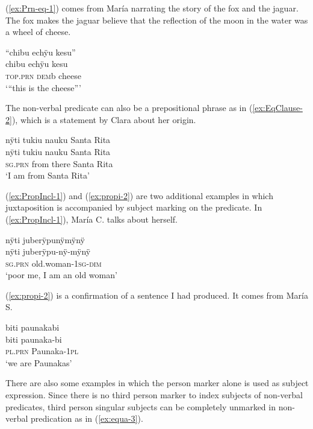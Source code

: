 (\ref{ex:Prn-eq-1}) comes from María narrating the story of the fox and the jaguar. The fox makes the jaguar believe that the reflection of the moon in the water was a wheel of cheese.

\ea\label{ex:Prn-eq-1}
\begingl
\glpreamble “chibu echÿu kesu”\\
\gla chibu echÿu kesu\\
\textsc{top.prn} \textsc{dem}b cheese\\
\glft ‘“this is the cheese”’
\endgl
\trailingcitation{[rxx-n120511l-1.037]}
\xe

The non-verbal predicate can also be a prepositional phrase as in (\ref{ex:EqClause-2}), which is a statement by Clara about her origin.

\ea\label{ex:EqClause-2}
\begingl 
\glpreamble nÿti tukiu nauku Santa Rita\\
\gla nÿti tukiu nauku {Santa Rita}\\ 
\textsc{sg.prn} from there {Santa Rita}\\ 
\glft ‘I am from Santa Rita’
\trailingcitation{[cxx-e121130s.011]}
\xe

(\ref{ex:PropIncl-1}) and (\ref{ex:propi-2}) are two additional examples in which juxtaposition is accompanied by subject marking on the predicate. In (\ref{ex:PropIncl-1}), María C. talks about herself.

\ea\label{ex:PropIncl-1}
\begingl 
\glpreamble nÿti juberÿpunÿmÿnÿ\\
\gla nÿti juberÿpu-nÿ-mÿnÿ\\ 
\textsc{sg.prn} old.woman-1\textsc{sg}-\textsc{dim}\\ 
\glft ‘poor me, I am an old woman’
\trailingcitation{[uxx-p110825l.038]}
\xe

(\ref{ex:propi-2}) is a confirmation of a sentence I had produced. It comes from María S.

\ea\label{ex:propi-2}
\begingl
\glpreamble biti paunakabi\\
\gla biti paunaka-bi\\
\textsc{pl.prn} Paunaka-1\textsc{pl}\\
\glft ‘we are Paunakas’
\endgl
\trailingcitation{[rmx-e150922l.103]}
\xe

There are also some examples in which the person marker alone is used as subject expression. Since there is no third person marker to index subjects of non-verbal predicates, third person singular subjects can be completely unmarked in non-verbal predication as in (\ref{ex:equa-3}).

